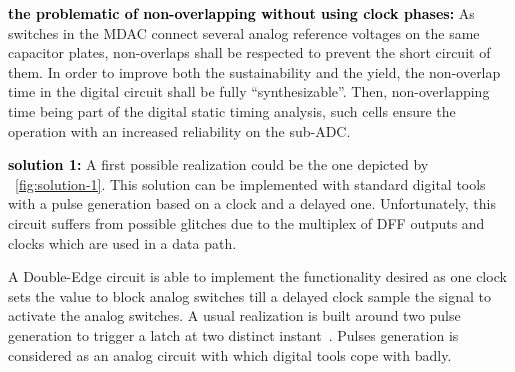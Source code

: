 \textbf{\textcolor{black}{the problematic of non-overlapping without using clock phases:}}
As switches in the MDAC connect several analog reference voltages on the same capacitor plates, non-overlaps shall be respected to prevent the short circuit of them. In order to improve both the sustainability and the yield, the non-overlap time in the digital circuit shall be fully ``synthesizable''. Then, non-overlapping time being part of the digital static timing analysis, such cells ensure the operation with an increased reliability on the sub-ADC\@.

\textbf{\textcolor{black}{solution 1:}}
A first possible realization could be the one depicted by \figurename~\ref{fig:solution-1}. This solution can be implemented with standard digital tools with a pulse generation based on a clock and a delayed one. Unfortunately, this circuit suffers from possible glitches due to the multiplex of DFF outputs and clocks which are used in a data path.

A Double-Edge circuit is able to implement the functionality desired as one clock sets the value to block analog switches till a delayed clock sample the signal to activate the analog switches. A usual realization is built around two pulse generation to trigger a latch at two distinct instant~\cite{Afghahi1996, Cheng2003dig, Murotiya2013, Bonetti2015}. Pulses generation is considered as an analog circuit with which digital tools cope with badly.

